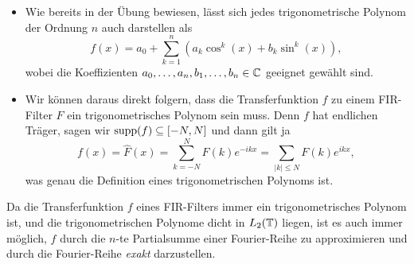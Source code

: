 \begin{remark}\leavevmode
\begin{itemize}
\item Wie bereits in der Übung bewiesen, lässt sich jedes trigonometrische Polynom der Ordnung
$ n $ auch darstellen als
\[
  f(x) = a_{0} + \sum_{k = 1}^{n} \left( a_{k}\cos^{k}(x) + b_{k}\sin^{k}(x) \right),
\]
wobei die Koeffizienten $ a_{0}, \ldots, a_{n}, b_{1}, \ldots, b_{n} \in \mathbb{C} $ geeignet gewählt sind.
\item Wir können daraus direkt folgern, dass die Transferfunktion $ f $ zu einem FIR-Filter
$ F $ ein trigonometrisches Polynom sein muss. Denn $ f $ hat endlichen Träger, sagen wir
$ \operatorname{supp}(f) \subseteq [-N, N] $ und dann gilt ja
\[
  f(x) = \widehat{F}(x) = \sum_{k = -N}^{N} F(k) e^{-ikx} = \sum_{|k| \leq N} F(k) e^{ikx},
\]
was genau die Definition eines trigonometrischen Polynoms ist.
\end{itemize}
\end{remark}

\begin{remark}
Da die Transferfunktion $ f $ eines FIR-Filters immer ein trigonometrisches Polynom ist, und die
trigonometrischen Polynome dicht in $ L_{2}(\mathbb{T}) $ liegen, ist es auch immer möglich, $ f $ durch
die $ n $-te Partialsumme einer Fourier-Reihe zu approximieren und durch die Fourier-Reihe 
\emph{exakt} darzustellen.
\end{remark}

